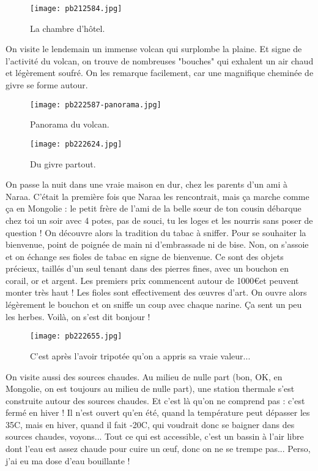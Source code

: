 \documentclass{book}
\begin{document}
\begin{figure}[h]
\centering
\texttt{[image: pb212584.jpg]}
\caption*{ La chambre d'hôtel.}
\end{figure}

On visite le lendemain un immense volcan qui surplombe la plaine. Et signe de l'activité du volcan, on trouve de nombreuses "bouches" qui exhalent un air chaud et légèrement soufré. On les remarque facilement, car une magnifique cheminée de givre se forme autour.


\begin{figure}[h]
\centering
\texttt{[image: pb222587-panorama.jpg]}
\caption*{ Panorama du volcan.}
\end{figure}


\begin{figure}[h]
\centering
\texttt{[image: pb222624.jpg]}
\caption*{ Du givre partout.}
\end{figure}

On passe la nuit dans une vraie maison en dur, chez les parents d'un ami à Naraa. C'était la première fois que Naraa les rencontrait, mais ça marche comme ça en Mongolie : le petit frère de l'ami de la belle sœur de ton cousin débarque chez toi un soir avec 4 potes, pas de souci, tu les loges et les nourris sans poser de question ! On découvre alors la tradition du tabac à sniffer. Pour se souhaiter la bienvenue, point de poignée de main ni d'embrassade ni de bise. Non, on s'assoie et on échange ses fioles de tabac en signe de bienvenue. Ce sont des objets précieux, taillés d'un seul tenant dans des pierres fines, avec un bouchon en corail, or et argent. Les premiers prix commencent autour de 1000\euro et peuvent monter très haut ! Les fioles sont effectivement des œuvres d'art. On ouvre alors légèrement le bouchon et on sniffe un coup avec chaque narine. Ça sent un peu les herbes. Voilà, on s'est dit bonjour !


\begin{figure}[h]
\centering
\texttt{[image: pb222655.jpg]}
\caption*{ C'est après l'avoir tripotée qu'on a appris sa vraie valeur...}
\end{figure}

On visite aussi des sources chaudes. Au milieu de nulle part (bon, OK, en Mongolie, on est toujours au milieu de nulle part), une station thermale s'est construite autour des sources chaudes. Et c'est là qu'on ne comprend pas : c'est fermé en hiver ! Il n'est ouvert qu'en été, quand la température peut dépasser les 35\textdegree C, mais en hiver, quand il fait -20\textdegree C, qui voudrait donc se baigner dans des sources chaudes, voyons... Tout ce qui est accessible, c'est un bassin à l'air libre dont l'eau est assez chaude pour cuire un œuf, donc on ne se trempe pas... Perso, j'ai eu ma dose d'eau bouillante !
\end{document}
